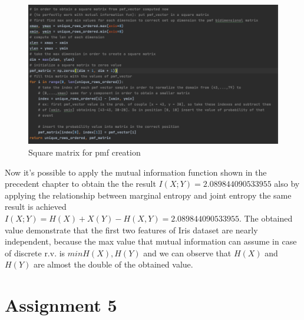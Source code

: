 \documentclass[12pt]{report}
\begin{document}
\begin{figure}[h!]
    \centering
    \includegraphics[width=16cm]{Pictures/Square matrix for pmf.png}
    \caption{Square matrix for pmf creation}
\end{figure}
\newpage
Now it's possible to apply the mutual information function shown in the precedent chapter to obtain the 
the result $I(X;Y) =  2.089844090533955$ also by applying the relationship between marginal entropy and
joint entropy the same result is achieved $I(X;Y) = H(X) + X(Y) - H(X,Y) =  2.089844090533955$. 
The obtained value demonstrate that the first two features of Iris dataset are nearly independent, because the max value that mutual information can assume in case of discrete r.v. is $min{H(X),H(Y)}$ and we can observe that $H(X)$ and $H(Y)$ are almost the double of the obtained value.



\chapter{Assignment 5}
\end{document}
